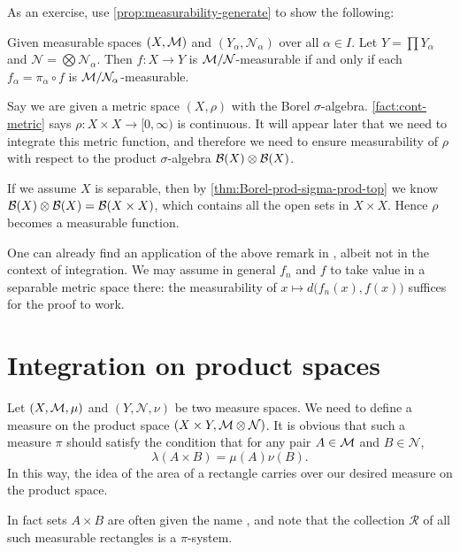As an exercise, use \cref{prop:measurability-generate} to show the following: 
\begin{xca} \label{xca:measurability-proj}
    Given measurable spaces $(X,\mathcal{M})$ and $(Y_\alpha,\mathcal{N}_\alpha)$ over all $\alpha \in I$. Let $Y = \prod Y_\alpha$ and $\mathcal{N} = \bigotimes \mathcal{N}_\alpha$. Then $f\colon X \to Y$ is $\mathcal{M}/\mathcal{N}$-measurable if and only if each $f_\alpha = \pi_\alpha \circ f$ is $\mathcal{M}/\mathcal{N}_\alpha$-measurable.
\end{xca}

\begin{rem} \label{rem:meas-metric-2nd-countable}
    Say we are given a metric space $(X,\rho)$ with the Borel $\sigma$-algebra. \cref{fact:cont-metric} says $\rho \colon X\times X \to [0,\infty)$ is continuous. 
    It will appear later that we need to integrate this metric function, and therefore we need to ensure measurability of $\rho$ with respect to the product $\sigma$-algebra $\mathcal{B}(X) \otimes \mathcal{B}(X)$.
    
    If we assume $X$ is separable, then by \cref{thm:Borel-prod-sigma-prod-top} we know $\mathcal{B}(X) \otimes \mathcal{B}(X) = \mathcal{B}(X \times X)$, which contains all the open sets in $X \times X$. Hence $\rho$ becomes a measurable function.
\end{rem}

One can already find an application of the above remark in , albeit not in the context of integration. We may assume in general $f_n$ and $f$ to take value in a separable metric space there: the measurability of $x \mapsto d\bigl(f_n(x),f(x)\bigr)$ suffices for the proof to work.

\section{Integration on product spaces} \label{sec:prod-integrate}
Let $(X,\mathcal{M},\mu)$ and $(Y,\mathcal N, \nu)$ be two measure spaces. We need to define a measure on the product space $(X\times Y,\mathcal{M} \otimes \mathcal N)$. It is obvious that such a measure $\pi$ should satisfy the condition that for any pair $A \in \mathcal{M}$ and $B \in \mathcal N$, \begin{equation}
    \lambda (A \times B) = \mu(A)\nu(B). \label{eq:prod-meas-primitive}    
\end{equation}
In this way, the idea of the area of a rectangle carries over our desired measure on the product space.

In fact sets $A \times B$ are often given the name , and note that the collection $\mathcal R$ of all such measurable rectangles is a $\pi$-system.


